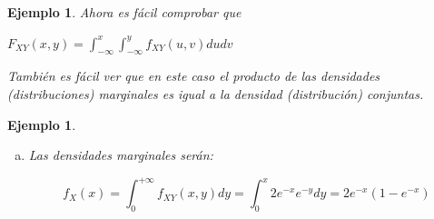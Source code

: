 \documentclass[12pt]{report}
\newtheorem{example}[definition]{Ejemplo}
\def\R{I\!\!R}
\begin{document}
\begin{example}
                Ahora es fácil comprobar que

                $\displaystyle F_{XY}(x,y)=\int_{-\infty}^{x}\int_{-\infty}^{y} f_{XY}(u,v)du
                dv$

                También es fácil ver que en este caso el producto de las densidades
                (distribuciones)  mar\-gi\-na\-les es igual a la densidad (distribución)
                conjuntas.

                \end{example}
                \begin{example}
                \begin{enumerate}[a)]
                  Encontrar el valor de $c$ para que

                  $f_{XY}(x,y)=\left\{
                   \begin{array}{ll}
                      c e^{-x} e^{-y} & \mbox{si } 0\leq y\leq x   \\
                      0 & \mbox{en otro caso}
                  \end{array}\right.$

                  Sea función de densidad.

                  Al igual que en el caso unidimensional es suficiente con que
                  la función sea integrable, no negativa e integre 1 en $\R^2$.
                 Las dos primeras condiciones son evidentes (si $c>0$), veamos la última:

                 $\displaystyle
                 \int_{-\infty}^{+\infty}\int_{-\infty}^{+\infty} f_{XY}(x,y)
                 dx dy=1$ y como
                 $\displaystyle\int_{0}^{+\infty}\int_{0}^{x}  e^{-x} e^{-y} dy dx=
                 \frac{1}{2}$

                 entonces $c=2$. Luego
                 $f_{XY}(x,y)=\left\{
                   \begin{array}{ll}
                      2 e^{-x} e^{-y} & \mbox{si } 0\leq y\leq x   \\
                      0 & \mbox{en otro caso}
                  \end{array}\right.$

                  \item Las densidades marginales serán:
                  
                  $$ f_{X}(x)=\int_{0}^{+\infty} f_{XY}(x,y) dy=
                  \int_{0}^{x} 2 e^{-x} e^{-y} dy= 2 e^{-x} (1-e^{-x})$$


\end{enumerate}
\end{example}
\end{document}

